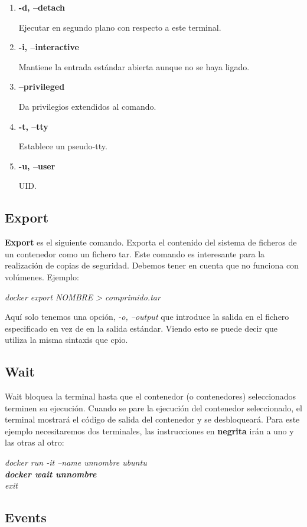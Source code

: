 \documentclass[]{article}
\begin{document}
\begin{enumerate}
\renewcommand{\labelenumi}{$ \bullet $}
\item {\bf -d, --detach}

Ejecutar en segundo plano con respecto a este terminal.
\item {\bf -i, --interactive}

Mantiene la entrada estándar abierta aunque no se haya ligado.
\item {\bf --privileged}

Da privilegios extendidos al comando.
\item {\bf -t, --tty}

Establece un pseudo-tty.
\item {\bf -u, --user}

UID.

\end{enumerate}

\subsection{Export}
{\bf Export} es el siguiente comando.
Exporta el contenido del sistema de ficheros de un contenedor como un fichero tar.
Este comando es interesante para la realización de copias de seguridad.
Debemos tener en cuenta que no funciona con volúmenes.
Ejemplo:
\begin{center}
	\it
	docker export NOMBRE > comprimido.tar
\end{center}

Aquí solo tenemos una opción, {\it -o, --output} que introduce la salida en el fichero especificado en vez de en la salida estándar.
Viendo esto se puede decir que utiliza la misma sintaxis que cpio.

\subsection{Wait}
Wait bloquea la terminal hasta que el contenedor (o contenedores) seleccionados terminen su ejecución.
Cuando se pare la ejecución del contenedor seleccionado, el terminal mostrará el código de salida del contenedor y se desbloqueará.
Para este ejemplo necesitaremos dos terminales, las instrucciones en {\bf negrita} irán a uno y las otras al otro:
\begin{center}
	\textit{
		docker run -it --name unnombre ubuntu\\
		\textbf{docker wait unnombre}\\
		\it exit
	}
\end{center}

\subsection{Events}
\end{document}
